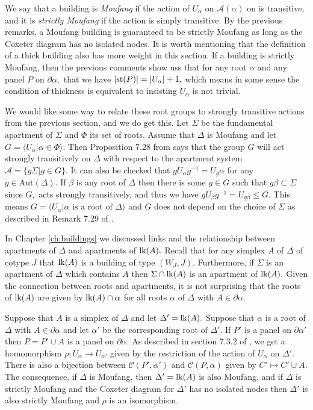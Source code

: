 \documentclass[class=book, crop=false,12 pt]{standalone}
\begin{document}
We say that a building is \emph{Moufang} if the action of $U_\alpha$ on $\mathcal{A}(\alpha)$ on is transitive, and it is \emph{strictly Moufang} if the action is simply transitive. By the previous remarks, a Moufang building is guaranteed to be strictly Moufang as long as the Coxeter diagram has no isolated nodes. It is worth mentioning that the definition of a thick building also has more weight in this section. If a building is strictly Moufang, then the previous comments show uss that for any root $\alpha$ and any panel $P$ on $\partial\alpha,$ that we have $|\mathrm{st}(P)|=|U_\alpha|+1,$ which means in some sense the condition of thickness is equivalent to insisting $U_\alpha$ is not trivial.

We would like some way to relate these root groups to strongly transitive actions from the previous section, and we do get this. Let $\Sigma$ be the fundamental apartment of $\Sigma$ and $\Phi$ its set of roots. Assume that $\Delta$ is Moufang and let $G=\langle U_\alpha|\alpha\in \Phi\rangle.$ Then Proposition 7.28 from \cite{buildings} says that the group $G$ will act strongly transitively on $\Delta$ with respect to the apartment system $\mathcal{A}=\{g\Sigma|g\in G\}.$ It can also be checked that $gU_\alpha g^{-1}=U_g\alpha$ for any $g\in \mathrm{Aut}(\Delta).$ If $\beta$ is any root of $\Delta$ then there is some $g\in G$ such that $g\beta\subset \Sigma$ since $G,$ acts strongly transitively, and thus we have $gU_\beta g^{-1}=U_{g\beta}\le G.$ This means $G=\langle U_{\alpha}|\alpha \text{ is a root of }\Delta\rangle$ and $G$ does not depend on the choice of $\Sigma$ as described in Remark 7.29 of \cite{buildings}.

In Chapter \ref{ch:buildings} we discussed links and the relationship between apartments of $\Delta$ and apartments of $\mathrm{lk}(A).$ Recall that for any simplex $A$ of $\Delta$ of cotype $J$ that $\mathrm{lk}(A)$ is a building of type $(W_J,J).$ Furthermore, if $\Sigma$ is an apartment of $\Delta$ which contains $A$ then $\Sigma\cap \mathrm{lk}(A)$ is an apartment of $\mathrm{lk}(A).$ Given the connection between roots and apartments, it is not surprising that the roots of $\mathrm{lk}(A)$ are given by $\mathrm{lk}(A)\cap \alpha$ for all roots $\alpha$ of $\Delta$ with $A\in \partial \alpha.$

Suppose that $A$ is a simplex of $\Delta$ and let $\Delta'=\mathrm{lk}(A).$ Suppose that $\alpha$ is a root of $\Delta$ with $A\in \partial \alpha$ and let $\alpha'$ be the corresponding root of $\Delta'.$ If $P'$ is a panel on $\partial \alpha'$ then $P=P'\cup A$ is a panel on $\partial \alpha.$ As described in section 7.3.2 of \cite{buildings}, we get a homomorphism $\rho:U_\alpha \to U_{\alpha'}$ given by the restriction of the action of $U_{\alpha}$ on $\Delta'.$ There is also a bijection between $\mathcal{C}(P',\alpha')$ and $\mathcal{C}(P,\alpha)$ given by $C'\mapsto C'\cup A.$ The consequence, if $\Delta$ is Moufang, then $\Delta'=\mathrm{lk}(A)$ is also Moufang, and if $\Delta$ is strictly Moufang and the Coxeter diagram for $\Delta'$ has no isolated nodes then $\Delta'$ is also strictly Moufang and $\rho$ is an isomorphism. 
\end{document}
